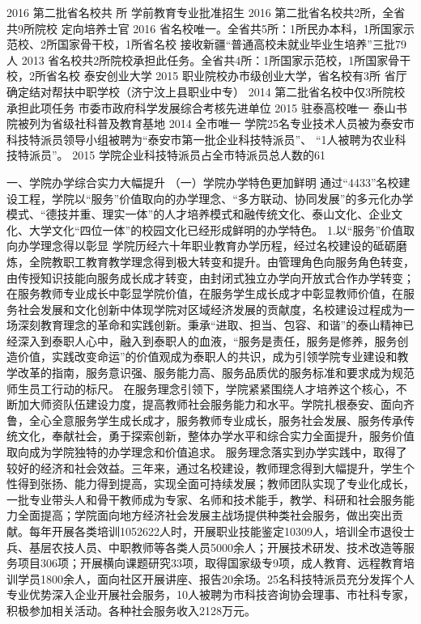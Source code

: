 2016
第二批省名校共  所
学前教育专业批准招生
2016
第二批省名校共2所，全省共9所院校
定向培养士官
2016
省名校唯一。全省共5所：1所民办本科，1所国家示范校、2所国家骨干校，1所省名校
接收新疆“普通高校未就业毕业生培养”三批79人
2013
省名校共2所院校承担此任务。全省共4所：1所国家示范校，1所国家骨干校，2所省名校
泰安创业大学
2015
职业院校办市级创业大学，省名校有3所
省厅确定结对帮扶中职学校（济宁汶上县职业中专）
2014
第二批省名校中仅3所院校承担此项任务
市委市政府科学发展综合考核先进单位
2015
驻泰高校唯一
泰山书院被列为省级社科普及教育基地
2014
全市唯一
学院25名专业技术人员被为泰安市科技特派员领导小组被聘为“泰安市第一批企业科技特派员”、 “1人被聘为农业科技特派员”。
2015
学院企业科技特派员占全市特派员总人数的61%

一、学院办学综合实力大幅提升
（一）学院办学特色更加鲜明
通过“4433”名校建设工程，学院以“服务”价值取向的办学理念、“多方联动、协同发展”的多元化办学模式、“德技并重、理实一体”的人才培养模式和融传统文化、泰山文化、企业文化、大学文化“四位一体”的校园文化已经形成鲜明的办学特色。
1.以“服务”价值取向办学理念得以彰显
学院历经六十年职业教育办学历程，经过名校建设的砥砺磨炼，全院教职工教育教学理念得到极大转变和提升。由管理角色向服务角色转变，由传授知识技能向服务成长成才转变，由封闭式独立办学向开放式合作办学转变；在服务教师专业成长中彰显学院价值，在服务学生成长成才中彰显教师价值，在服务社会发展和文化创新中体现学院对区域经济发展的贡献度，名校建设过程成为一场深刻教育理念的革命和实践创新。秉承“进取、担当、包容、和谐”的泰山精神已经深入到泰职人心中，融入到泰职人的血液，“服务是责任，服务是修养，服务创造价值，实践改变命运”的价值观成为泰职人的共识，成为引领学院专业建设和教学改革的指南，服务意识强、服务能力高、服务品质优的服务标准和要求成为规范师生员工行动的标尺。
在服务理念引领下，学院紧紧围绕人才培养这个核心，不断加大师资队伍建设力度，提高教师社会服务能力和水平。学院扎根泰安、面向齐鲁，全心全意服务学生成长成才，服务教师专业成长，服务社会发展、服务传承传统文化，奉献社会，勇于探索创新，整体办学水平和综合实力全面提升，服务价值取向成为学院独特的办学理念和价值追求。
服务理念落实到办学实践中，取得了较好的经济和社会效益。三年来，通过名校建设，教师理念得到大幅提升，学生个性得到张扬、能力得到提高，实现全面可持续发展；教师团队实现了专业化成长，一批专业带头人和骨干教师成为专家、名师和技术能手，教学、科研和社会服务能力全面提高；学院面向地方经济社会发展主战场提供种类社会服务，做出突出贡献。每年开展各类培训1052622人时，开展职业技能鉴定10309人，培训全市退役士兵、基层农技人员、中职教师等各类人员5000余人；开展技术研发、技术改造等服务项目306项；开展横向课题研究33项，取得国家级专9项，成人教育、远程教育培训学员1800余人，面向社区开展讲座、报告20余场。25名科技特派员充分发挥个人专业优势深入企业开展社会服务，10人被聘为市科技咨询协会理事、市社科专家，积极参加相关活动。各种社会服务收入2128万元。
